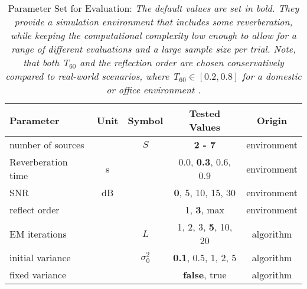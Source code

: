 \newcommand{\default}[1]{\textbf{#1}}
\begin{table}[H]
	\centering
	\begin{tabular}{lcccc}
		\toprule
		Parameter          & Unit & Symbol       & Tested Values                 & Origin      \\
		\midrule
		number of sources  &      & $S$          & \default{2 - 7}               & environment \\
		Reverberation time & s    & \Tsixty      & 0.0, \default{0.3}, 0.6, 0.9  & environment \\
		SNR                & dB   &              & \default{0}, 5, 10, 15, 30    & environment \\
		reflect order      &      &              & 1, \default{3}, max           & environment \\
		EM iterations      &      & $L$          & 1, 2, 3, \default{5}, 10, 20  & algorithm   \\
		initial variance   &      & $\sigma^2_0$ & \default{0.1}, $0.5$, 1, 2, 5 & algorithm   \\
		fixed variance     &      &              & \default{false}, true         & algorithm   \\
		\bottomrule
	\end{tabular}
	\label{table:parameterset}
	\caption[Parameter Set for Evaluation]{Parameter Set for Evaluation: \itshape The default values are set in bold. They provide a simulation environment that includes some reverberation, while keeping the computational complexity low enough to allow for a range of different evaluations and a large sample size per trial. Note, that both T$_{60}$ and the reflection order are chosen conservatively compared to real-world scenarios, where T$_{60}\in [0.2, 0.8]$ for a domestic or office environment \cite[p.695]{Gannot2017}.}
\end{table}
